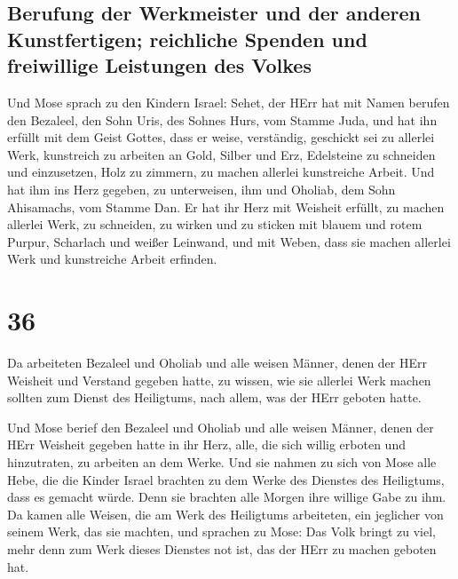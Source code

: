 \hypertarget{berufung-der-werkmeister-und-der-anderen-kunstfertigen-reichliche-spenden-und-freiwillige-leistungen-des-volkes}{%
\subsection{Berufung der Werkmeister und der anderen Kunstfertigen;
reichliche Spenden und freiwillige Leistungen des
Volkes}\label{berufung-der-werkmeister-und-der-anderen-kunstfertigen-reichliche-spenden-und-freiwillige-leistungen-des-volkes}}

 Und Mose sprach zu den Kindern Israel: Sehet, der HErr
hat mit Namen berufen den Bezaleel, den Sohn Uris, des Sohnes Hurs, vom
Stamme Juda,  und hat ihn erfüllt mit dem Geist Gottes,
dass er weise, verständig, geschickt sei zu allerlei Werk,
 kunstreich zu arbeiten an Gold, Silber und Erz,
 Edelsteine zu schneiden und einzusetzen, Holz zu
zimmern, zu machen allerlei kunstreiche Arbeit.  Und hat
ihm ins Herz gegeben, zu unterweisen, ihm und Oholiab, dem Sohn
Ahisamachs, vom Stamme Dan.  Er hat ihr Herz mit Weisheit
erfüllt, zu machen allerlei Werk, zu schneiden, zu wirken und zu sticken
mit blauem und rotem Purpur, Scharlach und weißer Leinwand, und mit
Weben, dass sie machen allerlei Werk und kunstreiche Arbeit erfinden.

\hypertarget{section-35}{%
\section{36}\label{section-35}}

 Da arbeiteten Bezaleel und Oholiab und alle weisen
Männer, denen der HErr Weisheit und Verstand gegeben hatte, zu wissen,
wie sie allerlei Werk machen sollten zum Dienst des Heiligtums, nach
allem, was der HErr geboten hatte.

 Und Mose berief den Bezaleel und Oholiab und alle weisen
Männer, denen der HErr Weisheit gegeben hatte in ihr Herz, alle, die
sich willig erboten und hinzutraten, zu arbeiten an dem Werke.
 Und sie nahmen zu sich von Mose alle Hebe, die die Kinder
Israel brachten zu dem Werke des Dienstes des Heiligtums, dass es
gemacht würde. Denn sie brachten alle Morgen ihre willige Gabe zu ihm.
 Da kamen alle Weisen, die am Werk des Heiligtums
arbeiteten, ein jeglicher von seinem Werk, das sie machten,
 und sprachen zu Mose: Das Volk bringt zu viel, mehr denn
zum Werk dieses Dienstes not ist, das der HErr zu machen geboten hat.

